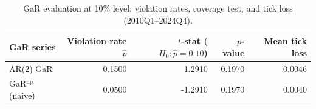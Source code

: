 \begin{table}[H]
  \centering
  \caption{GaR evaluation at 10\% level: violation rates, coverage test, and tick loss (2010Q1--2024Q4).}
  \label{tab:gar_eval}
  \begin{tabular}{lrrrr}
  \toprule
  GaR series & Violation rate $\hat{p}$ & $t$-stat ($H_0\colon\hat{p}=0.10$) & $p$-value & Mean tick loss \\
  \midrule
  AR(2) GaR & 0.1500 & 1.2910 & 0.1970 & 0.0046 \\
  GaR$^{\mathrm{np}}$ (naive) & 0.0500 & -1.2910 & 0.1970 & 0.0040 \\
  \bottomrule
  \end{tabular}
\end{table}
